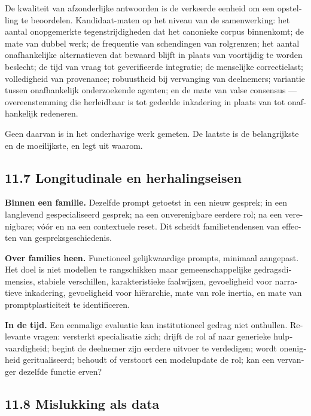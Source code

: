 \begin{dutch}
De kwaliteit van afzonderlijke antwoorden is de verkeerde eenheid om een opstelling te beoordelen. Kandidaat-maten op het niveau van de samenwerking: het aantal onopgemerkte tegenstrijdigheden dat het canonieke corpus binnenkomt; de mate van dubbel werk; de frequentie van schendingen van rolgrenzen; het aantal onafhankelijke alternatieven dat bewaard blijft in plaats van voortijdig te worden beslecht; de tijd van vraag tot geverifieerde integratie; de menselijke correctielast; volledigheid van provenance; robuustheid bij vervanging van deelnemers; variantie tussen onafhankelijk onderzoekende agenten; en de mate van valse consensus — overeenstemming die herleidbaar is tot gedeelde inkadering in plaats van tot onafhankelijk redeneren.

Geen daarvan is in het onderhavige werk gemeten. De laatste is de belangrijkste en de moeilijkste, en  legt uit waarom.


\subsection*{11.7 Longitudinale en herhalingseisen}
\label{sec:nl:11.7}

\textbf{Binnen een familie.} Dezelfde prompt getoetst in een nieuw gesprek; in een langlevend gespecialiseerd gesprek; na een onverenigbare eerdere rol; na een verenigbare; vóór en na een contextuele reset. Dit scheidt familietendensen van effecten van gespreksgeschiedenis.

\textbf{Over families heen.} Functioneel gelijkwaardige prompts, minimaal aangepast. Het doel is niet modellen te rangschikken maar gemeenschappelijke gedragsdimensies, stabiele verschillen, karakteristieke faalwijzen, gevoeligheid voor narratieve inkadering, gevoeligheid voor hiërarchie, mate van role inertia, en mate van promptplasticiteit te identificeren.

\textbf{In de tijd.} Een eenmalige evaluatie kan institutioneel gedrag niet onthullen. Relevante vragen: versterkt specialisatie zich; drijft de rol af naar generieke hulpvaardigheid; begint de deelnemer zijn eerdere uitvoer te verdedigen; wordt onenigheid geritualiseerd; behoudt of verstoort een modelupdate de rol; kan een vervanger dezelfde functie erven?


\subsection*{11.8 Mislukking als data}
\label{sec:nl:11.8}


\end{dutch}
